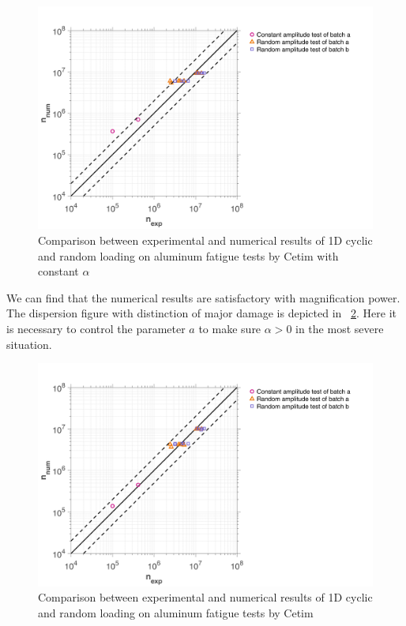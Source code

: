 \documentclass[3p,times,number,review]{elsarticle}
\newcommand{\figref}[1]{\figurename~\ref{#1}}
\begin{document}
\begin{figure}[!h]
	\centering
	\includegraphics[width=\textwidth]{figures//Cetim_err_alpfix.png} 
	\caption{Comparison between experimental and numerical results of 1D cyclic and random loading on aluminum fatigue tests by Cetim with constant $\alpha$}
	\label{fig.Cetimerralpfix}
\end{figure}

We can find that the numerical results are satisfactory with magnification power. The dispersion figure with distinction of major damage is depicted in \figref{fig.Cetimerr}. Here it is necessary to control the parameter $a$ to make sure $\alpha>0$ in the most severe situation.

\begin{figure}[!h]
	\centering
	\includegraphics[width=\textwidth]{figures//Cetim_err.png} 
	\caption{Comparison between experimental and numerical results of 1D cyclic and random loading on aluminum fatigue tests by Cetim}
	\label{fig.Cetimerr}
\end{figure}
\end{document}
